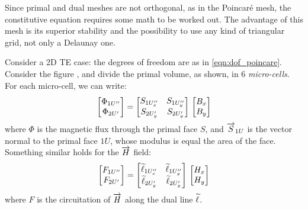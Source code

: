 
Since primal and dual meshes are not orthogonal, as in the Poincar\'e
mesh, the constitutive equation requires some math to be worked
out. The advantage of this mesh is its superior stability and the
possibility to use any kind of triangular grid, not only a Delaunay
one.

Consider a 2D TE case: the degrees of freedom are as in
\eqref{eqn:dof_poincare}. Consider the figure , and divide the primal volume, as shown, in 6
\emph{micro-cells}. For each micro-cell, we can write:
\begin{align}
  \begin{bmatrix} \Phi_{1U''} \\ \Phi_{2U'} \end{bmatrix} = {
  \begin{bmatrix} S_{1U_x''} & S_{1U_y''} \\ S_{2U_y'} & S_{2U_y'}
  \end{bmatrix}\,
  \begin{bmatrix} B_x \\ B_y \end{bmatrix}}
\end{align}
where $\Phi$ is the magnetic flux through the primal face $S$, and
$\overrightarrow{S}_{1U}$ is the vector normal to the primal face $1U$, whose
modulus is equal the area of the face. Something similar holds for the
$\overrightarrow{H}$ field:
\begin{align}
  \begin{bmatrix} F_{1U''} \\ F_{2U'} \end{bmatrix} = {
  \begin{bmatrix} \widetilde{\ell}_{1U_x''} & \widetilde{\ell}_{1U_y''} \\
    \widetilde{\ell}_{2U_y'} & \widetilde{\ell}_{2U_y'} \end{bmatrix}\,
  \begin{bmatrix} H_x \\ H_y \end{bmatrix}}
\end{align}
where $F$ is the circuitation of $\overrightarrow{H}$ along the dual line
$\widetilde{\ell}$.

